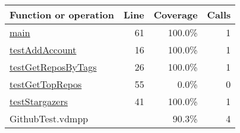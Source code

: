 \bigskip
\begin{longtable}{|l|r|r|r|}
\hline
Function or operation & Line & Coverage & Calls \\
\hline
\hline
\hyperref[main:61]{main} & 61&100.0\% & 1 \\
\hline
\hyperref[testAddAccount:16]{testAddAccount} & 16&100.0\% & 1 \\
\hline
\hyperref[testGetReposByTags:26]{testGetReposByTags} & 26&100.0\% & 1 \\
\hline
\hyperref[testGetTopRepos:55]{testGetTopRepos} & 55&0.0\% & 0 \\
\hline
\hyperref[testStargazers:41]{testStargazers} & 41&100.0\% & 1 \\
\hline
\hline
GithubTest.vdmpp & & 90.3\% & 4 \\
\hline
\end{longtable}

